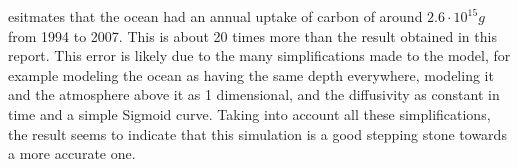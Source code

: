 \documentclass{article}
\begin{document}
    \citeauthor{Gruber1193} esitmates that the ocean had an annual uptake of carbon of around $2.6\cdot 10^{15}\si{g}$ from 1994 to 2007. This is about 20 times more than the result obtained in this report. This error is likely due to the many simplifications made to the model, for example modeling the ocean as having the same depth everywhere, modeling it and the atmosphere above it as 1 dimensional, and the diffusivity as constant in time and a simple Sigmoid curve. Taking into account all these simplifications, the result seems to indicate that this simulation is a good stepping stone towards a more accurate one.

    \printbibliography
\end{document}
